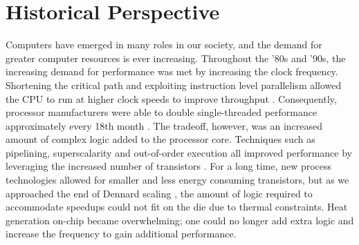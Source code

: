 \section{Historical Perspective}

Computers have emerged in many roles in our society, and the demand for greater
computer resources is ever increasing. Throughout the '80s and '90s, the
increasing demand for performance was met by increasing the clock frequency.
Shortening the critical path and exploiting instruction level parallelism
allowed the CPU to run at higher clock speeds to improve throughput
\cite{tanenbaum1984structured}. Consequently, processor manufacturers were able
to double single-threaded performance approximately every 18th month
\cite{moore1965cramming}. The tradeoff, however, was an increased amount of
complex logic added to the processor core. Techniques such as pipelining,
superscalarity and out-of-order execution all improved performance by leveraging
the increased number of transistors \cite{patterson}. For a long time, new
process technologies allowed for smaller and less energy consuming transistors,
but as we approached the end of Dennard scaling
\cite{dennard1974design,esmaeilzadeh2011dark}, the amount of logic required to
accommodate speedups could not fit on the die due to thermal constraints. Heat
generation on-chip became overwhelming; one could no longer add extra logic and
increase the frequency to gain additional performance.

